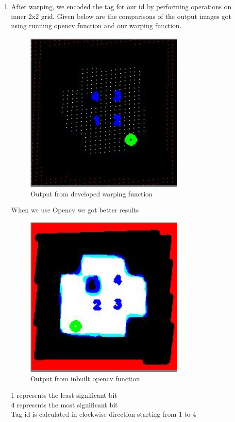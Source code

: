 \documentclass[12pt]{article}
\begin{document}
\begin{enumerate}
\item After warping, we encoded the tag for our id by performing operations on inner 2x2 grid. Given below are the comparisons of the output images got using running opencv function and our warping function.
\begin{figure}[h]
    \centering
    \includegraphics[width=8cm]{warping_coded}
    \caption{Output from developed warping function}
    \label{fig:warping_coded}
\end{figure}
When we use Opencv we got better results
\begin{figure}[h]
    \centering
    \includegraphics[width=8cm]{warping_opencv}
    \caption{Output from inbuilt opencv function}
    \label{fig:warping_coded}
\end{figure}
\begin{center}
    1 represents the least significant bit\\
    4 represents the most significant bit \\
    Tag id is calculated in clockwise direction starting from 1 to 4

\end{center}
\end{enumerate}
\end{document}

